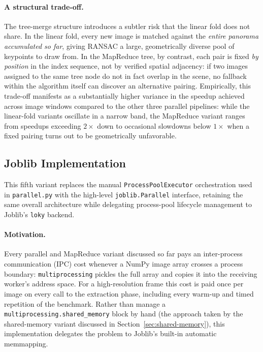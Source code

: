 \documentclass[10pt,twocolumn,letterpaper]{article}
\begin{document}
\paragraph{A structural trade-off.}
The tree-merge structure introduces a subtler risk that the linear fold does not share.
In the linear fold, every new image is matched against the \emph{entire panorama
accumulated so far}, giving RANSAC a large, geometrically diverse pool of keypoints to draw
from. In the MapReduce tree, by contrast, each pair is fixed \emph{by position} in the
index sequence, not by verified spatial adjacency: if two images assigned to the same
tree node do not in fact overlap in the scene, no fallback within the algorithm itself
can discover an alternative pairing. Empirically, this trade-off manifests as a
substantially higher variance in the speedup achieved across image windows compared to
the other three parallel pipelines: while the linear-fold variants oscillate in a narrow
band, the MapReduce variant ranges from speedups exceeding $2\times$ down to occasional
slowdowns below $1\times$ when a fixed pairing turns out to be geometrically unfavorable.

\subsection{Joblib Implementation}

This fifth variant replaces the manual \texttt{ProcessPoolExecutor} orchestration used in
\texttt{parallel.py} with the high-level \texttt{joblib.Parallel} interface, retaining the
same overall architecture while delegating
process-pool lifecycle management to Joblib's \texttt{loky} backend.

\paragraph{Motivation.}
Every parallel and MapReduce variant discussed so far pays an inter-process communication
(IPC) cost whenever a NumPy image array crosses a process boundary: \texttt{multiprocessing}
pickles the full array and copies it into the receiving worker's address space. For a
high-resolution frame this cost is paid once per image on every call to
the extraction phase, including every warm-up and timed repetition of the benchmark. Rather
than manage a \texttt{multiprocessing.shared\_memory} block by hand (the approach taken by the
shared-memory variant discussed in Section~\ref{sec:shared-memory}), this implementation
delegates the problem to Joblib's built-in automatic memmapping.
\end{document}
